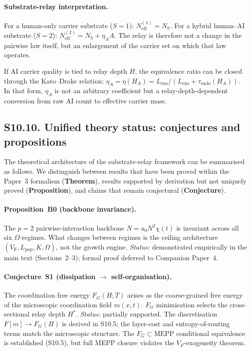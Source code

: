 \documentclass[11pt]{article}
\newcommand{\VF}{V_{\mathrm{F}}}
\begin{document}
\paragraph{Substrate-relay interpretation.}
For a human-only carrier substrate ($S=1$): $N_{\mathrm{eff}}^{(1)}=N_h$.
For a hybrid human--AI substrate ($S=2$): $N_{\mathrm{eff}}^{(2)}=N_h+\eta_A A$.
The relay is therefore not a change in the pairwise law itself, but an enlargement of the carrier set on which that law operates.

If AI carrier quality is tied to relay depth $H$, the equivalence ratio can be closed through the Kato--Drake relation:
$\eta_A = \eta(H_A) = L_{\mathrm{exo}} / (L_{\mathrm{exo}}+\tau_{\mathrm{endo}}(H_A))$. %
In that form, $\eta_A$ is not an arbitrary coefficient but a relay-depth-dependent conversion from raw AI count to effective carrier mass.

\subsection*{S10.10. Unified theory status: conjectures and propositions}

The theoretical architecture of the substrate-relay framework can be
summarised as follows. We distinguish between results that have been
proved within the Paper~3 formalism (\textbf{Theorem}), results supported by derivation but not uniquely proved (\textbf{Proposition}), and claims that
remain conjectural (\textbf{Conjecture}).

\paragraph{Proposition~B0 (backbone invariance).}
The $p=2$ pairwise-interaction backbone
$\dot N = a_0 N^2\chi(t)$ is invariant across all six $\Omega$-regimes.
What changes between regimes is the ceiling architecture
$(\VF, L_{\mathrm{pop}}, K, \Omega)$, not the growth engine.
\emph{Status:} demonstrated empirically in the main text (Sections~2--3); formal proof deferred to Companion Paper~4.

\paragraph{Conjecture~S1 (dissipation $\to$ self-organisation).}
The coordination free energy $F_G(H;T)$ arises as the coarse-grained
free energy of the microscopic coordination field $m(x,t)$.
$F_G$ minimisation selects the cross-sectional relay depth $H^*$.
\emph{Status:} partially supported. The discretisation
$F[m]\to F_G(H)$ is derived in S10.5; the layer-cost and
entropy-of-routing terms match the microscopic structure. The
$F_G\subset\mathrm{MEPP}$ conditional equivalence is established
(S10.5), but full MEPP closure violates the $V_F$-exogeneity theorem.
\end{document}
